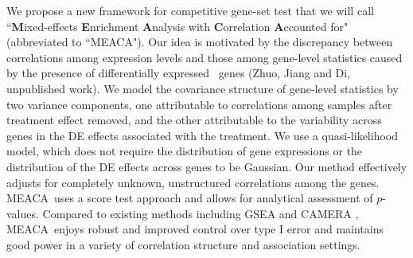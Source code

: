 \documentclass[a4,center,fleqn]{NAR}
\newcommand{\OurMethod}{MEACA}
\newcommand{\thepapertobefinished}{Zhuo, Jiang and Di, unpublished work}
\newcommand{\DED}{differentially expressed}
\begin{document}
%	



We propose a new framework for competitive gene-set test that we will call 
``\textbf{M}ixed-effects \textbf{E}nrichment \textbf{A}nalysis with \textbf{C}orrelation 
\textbf{A}ccounted for" 
(abbreviated to ``\OurMethod"). Our idea is motivated by the discrepancy between correlations
among expression levels and those among gene-level statistics caused by the presence of \DED~ 
genes (\thepapertobefinished). 
We model the covariance structure of gene-level statistics by two 
variance components, one attributable to correlations among samples after treatment effect 
removed, and the other attributable to the variability across genes in the DE effects 
associated with the treatment. 
We use a quasi-likelihood model, which does not require the distribution of gene expressions or 
the distribution of the DE effects across genes to be Gaussian. Our method effectively 
adjusts for completely unknown,	unstructured correlations among the genes. \OurMethod~uses a 
score test approach and allows for analytical assessment of $p$-values. Compared to existing 
methods including GSEA \citep{subramanian2005gene} and CAMERA \citep{wu2012camera}, 
\OurMethod~enjoys robust and improved control over type I 
error and maintains good power in a	variety of correlation structure and association settings. 
\end{document}

